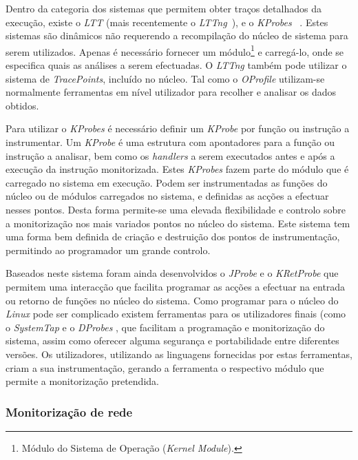 \documentclass[a4paper]{llncs}
\begin{document}
Dentro da categoria dos sistemas que permitem obter traços detalhados da execução, existe o \textit{LTT} (mais recentemente o \textit{LTTng}~\cite{Mathieu2009}), e o \textit{KProbes} ~\cite{kernel_debug_printk_on_fly}. %
Estes sistemas são dinâmicos não requerendo a recompilação do núcleo de sistema para serem utilizados.
 Apenas é necessário fornecer um módulo\footnote{Módulo do Sistema de Operação (\textit{Kernel Module}).} e carregá-lo, onde se especifica quais as análises a serem efectuadas.
 O \textit{LTTng} também pode utilizar o sistema de \textit{TracePoints}, incluído no núcleo.
 Tal como o \textit{OProfile} utilizam-se normalmente ferramentas em nível utilizador para recolher e analisar os dados obtidos.

Para utilizar o \textit{KProbes} é necessário definir um \textit{KProbe} por função ou instrução a instrumentar.
 Um \textit{KProbe} é uma estrutura com apontadores para a função ou instrução a analisar, bem como os \textit{handlers} a serem executados antes e após a execução da instrução monitorizada.
 Estes \textit{KProbes} fazem parte do módulo que é carregado no sistema em execução.
Podem ser instrumentadas as funções do núcleo ou de módulos carregados no sistema, e definidas as acções a efectuar nesses pontos.
Desta forma permite-se uma elevada flexibilidade e controlo sobre a monitorização nos mais variados pontos no núcleo do sistema.
Este sistema tem uma forma bem definida de criação e destruição dos pontos de instrumentação, permitindo ao programador um grande controlo.

 Baseados neste sistema foram ainda desenvolvidos o \textit{JProbe} e o \textit{KRetProbe} que permitem uma interacção que facilita programar as acções a efectuar na entrada ou retorno de funções no núcleo do sistema.
 Como programar para o núcleo do \textit{Linux} pode ser complicado existem ferramentas para os utilizadores finais (como o \textit{SystemTap} %
 e o \textit{DProbes} %
,  que facilitam a programação e monitorização do sistema, assim como oferecer alguma segurança e portabilidade entre diferentes  versões. Os utilizadores, utilizando as linguagens fornecidas por estas ferramentas, criam a sua instrumentação, gerando a ferramenta o respectivo módulo que permite a monitorização pretendida.

\subsubsection{Monitorização de rede}
\label{subsub:mon_network__with_dynamic_filters_linux}
\end{document}
